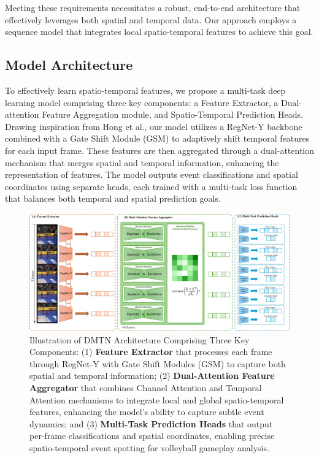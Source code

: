 \documentclass[conference]{IEEEtran}
\begin{document}
Meeting these requirements necessitates a robust, end-to-end architecture that effectively leverages both spatial and temporal data. Our approach employs a sequence model that integrates local spatio-temporal features to achieve this goal.


\subsection{Model Architecture}
To effectively learn spatio-temporal features, we propose a multi-task deep learning model comprising three key components: a Feature Extractor, a Dual-attention Feature Aggregation module, and Spatio-Temporal Prediction Heads. Drawing inspiration from Hong et al.\cite{spot22}, our model utilizes a RegNet-Y backbone \cite{radosavovic2020designingnetworkdesignspaces} combined with a Gate Shift Module (GSM) \cite{9156729} to adaptively shift temporal features for each input frame. These features are then aggregated through a dual-attention mechanism that merges spatial and temporal information, enhancing the representation of features. The model outputs event classifications and spatial coordinates using separate heads, each trained with a multi-task loss function that balances both temporal and spatial prediction goals.


\begin{figure} 
    \centering
    \includegraphics[width=\textwidth]{figures/fig-arch.jpg}
    \caption{Illustration of DMTN Architecture Comprising Three Key Components: (1) \textbf{Feature Extractor} that processes each frame through RegNet-Y with Gate Shift Modules (GSM) to capture both spatial and temporal information; (2) \textbf{Dual-Attention Feature Aggregator} that combines Channel Attention and Temporal Attention mechanisms to integrate local and global spatio-temporal features, enhancing the model’s ability to capture subtle event dynamics; and (3) \textbf{Multi-Task Prediction Heads} that output per-frame classifications and spatial coordinates, enabling precise spatio-temporal event spotting for volleyball gameplay analysis.}    \label{fig-arch}
\end{figure}
\end{document}
